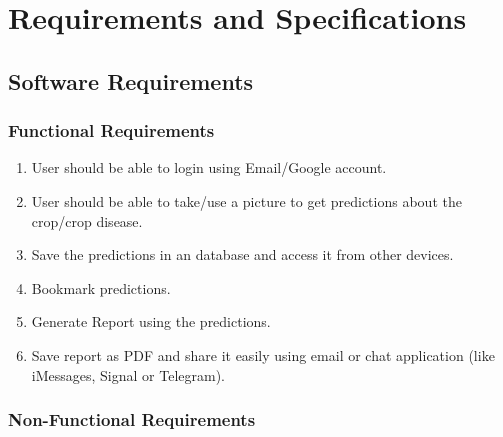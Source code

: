 \documentclass[../Report.tex]{subfiles}
\begin{document}
\chapter{Requirements and  Specifications}

\section{Software Requirements}

\subsection{Functional Requirements}

\begin{enumerate}
  \item User should be able to login using Email/Google account.
  
  \item User should be able to take/use a picture to get predictions about the crop/crop disease.
  
  \item Save the predictions in an database and access it from other devices.
  
  \item Bookmark predictions.
  
  \item Generate Report using the predictions.
  
  \item Save report as PDF and share it easily using email or chat application (like iMessages, Signal or Telegram).

\end{enumerate}

\subsection{Non-Functional Requirements}
\end{document}
